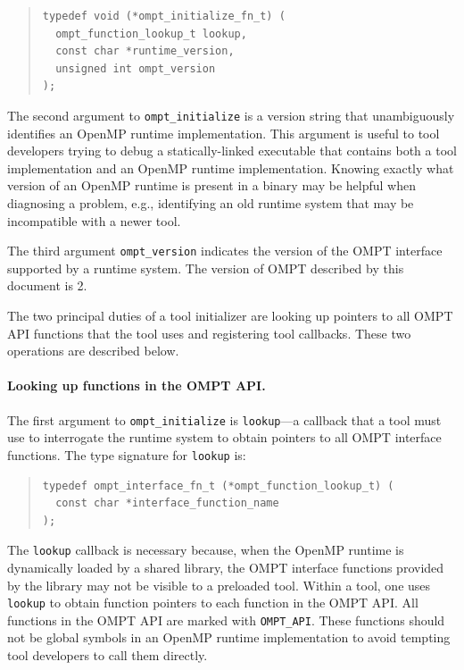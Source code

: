 \documentclass{article}
\begin{document}
\begin{quote}
\begin{lstlisting}
typedef void (*ompt_initialize_fn_t) (
  ompt_function_lookup_t lookup,
  const char *runtime_version, 
  unsigned int ompt_version
);
\end{lstlisting}
\end{quote}
The second argument to  \lstinline|ompt_initialize| is a version string that unambiguously identifies an OpenMP runtime implementation. This argument is useful to tool developers trying to debug a statically-linked executable that contains both a tool implementation and an OpenMP runtime implementation. Knowing exactly what version of an OpenMP runtime is present in a binary may be helpful when diagnosing a problem, e.g., identifying an old runtime system that may be incompatible with a newer tool.

The third argument \lstinline|ompt_version| indicates the version of the OMPT interface supported by a runtime system.
The version of OMPT described by this document is 2.

The two principal duties of a tool initializer are looking up pointers to all OMPT API functions that the tool uses and registering tool callbacks.  These two operations are described below.

\paragraph{Looking up functions in the OMPT API.} The first argument to \lstinline|ompt_initialize| is \lstinline|lookup|---a callback that a tool must use to interrogate the runtime system to obtain pointers to all OMPT interface functions.
The type signature for  \lstinline|lookup| is:

\begin{quote}
\begin{lstlisting}
typedef ompt_interface_fn_t (*ompt_function_lookup_t) (
  const char *interface_function_name
);
\end{lstlisting}
\end{quote}

\noindent
The \lstinline|lookup| callback is necessary because, when the OpenMP runtime is dynamically loaded by a shared library, the OMPT interface functions provided by the library may not be visible to a preloaded tool. Within a tool, one uses \lstinline|lookup| to obtain function pointers to each function in the OMPT API.  All functions in the OMPT API are marked with \lstinline|OMPT_API|. These functions should not be global symbols in an OpenMP runtime implementation to avoid tempting tool developers to call them directly. 
\end{document}
